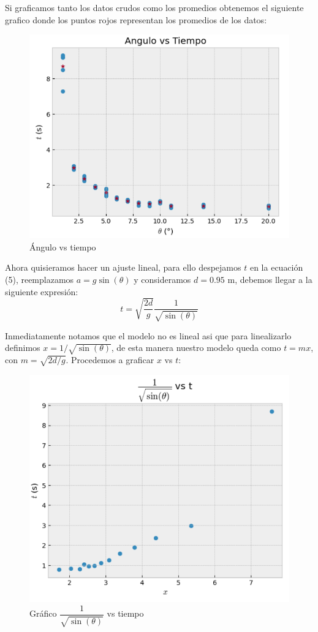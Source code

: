 \documentclass{article}
\begin{document}
Si graficamos tanto los datos crudos como los promedios obtenemos el 
siguiente grafico donde los puntos rojos representan los promedios de 
los datos:
\begin{figure}[H]
\centering
\includegraphics[scale=0.55]{img/grafico1.png}
\caption{Ángulo vs tiempo}
\label{fig:angulo-tiempo}
\end{figure}

Ahora quisieramos hacer un ajuste lineal, para ello despejamos $t$ en la 
ecuación (5), reemplazamos $a = g \sin(\theta)$ y consideramos $d = 0.95$ 
m, debemos llegar a la siguiente expresión:
\begin{equation}
   t = \sqrt{\dfrac{2d}{g}} \dfrac{1}{\sqrt{\sin(\theta)}}
\end{equation}

Inmediatamente notamos que el modelo no es lineal asi que para linealizarlo definimos 
$x = 1/\sqrt{\sin(\theta)}$, de esta manera nuestro modelo queda como 
$t = m x$, con $m = \sqrt{2d/g}$. Procedemos a graficar $x$ vs $t$:
\begin{figure}[H]
\centering
\includegraphics[scale=0.55]{img/grafico2.png}
\caption{Gráfico $\dfrac{1}{\sqrt{\sin(\theta)}}$ vs tiempo}
\label{fig:ajuste-lineal}
\end{figure}
\end{document}
